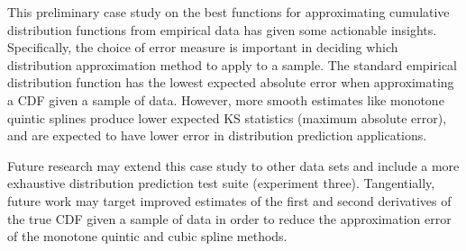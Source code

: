 \documentclass[letterpaper, 10 pt, conference]{ieeeconf}  %
\begin{document}
This preliminary case study on the best functions for approximating cumulative distribution functions from empirical data has given some actionable insights. Specifically, the choice of error measure is important in deciding which distribution approximation method to apply to a sample. The standard empirical distribution function has the lowest expected absolute error when approximating a CDF given a sample of data. However, more smooth estimates like monotone quintic splines produce lower expected KS statistics (maximum absolute error), and are expected to have lower error in distribution prediction applications.

Future research may extend this case study to other data sets and include a more exhaustive distribution prediction test suite (experiment three). Tangentially, future work may target improved estimates of the first and second derivatives of the true CDF given a sample of data in order to reduce the approximation error of the monotone quintic and cubic spline methods.

\balance








\end{document}
